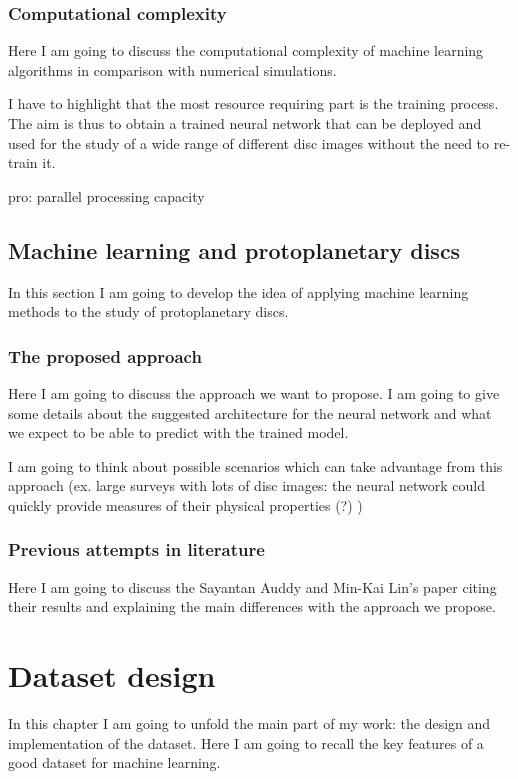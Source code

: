 \documentclass[a4paper,10pt]{report}
\begin{document}
\subsection{Computational complexity}
Here I am going to discuss the computational complexity of machine learning
 algorithms in comparison with numerical simulations.

I have to highlight that the most resource requiring part is the training process.
The aim is thus to obtain a trained neural network that can be deployed and used for the study of
a wide range of different disc images without the need to re-train it.

pro: parallel processing capacity

\section{Machine learning and protoplanetary discs}

In this section I am going to develop the idea of applying machine learning methods to the  study of protoplanetary
discs.

\subsection{The proposed approach}

Here I am going to discuss the approach we want to propose.
 I am going to give some details about the 
suggested architecture for the neural network and what 
we expect to be able to predict with the trained
model.

I am going to think about possible scenarios which can take advantage from this approach
(ex. large surveys with lots of disc images: the neural network 
could quickly provide measures of their physical properties (?) )

\subsection{Previous attempts in literature}

Here I am going to discuss the Sayantan Auddy and Min-Kai Lin's paper citing their results
and explaining the main differences with the approach we propose.

\chapter{Dataset design}

In this chapter I am going to unfold the main part of my work: the design and implementation of the dataset.
Here I am going to recall the key features of a good dataset for machine learning.
\end{document}
